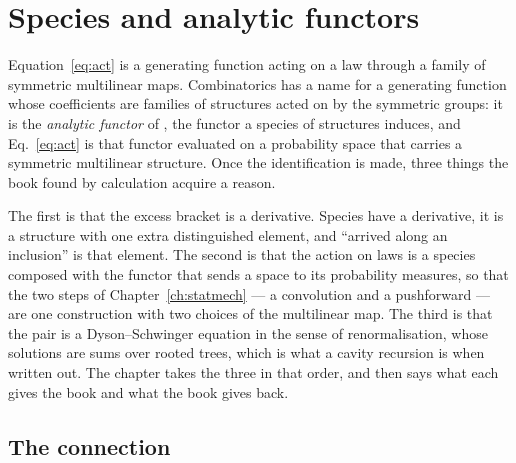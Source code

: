\chapter{Species and analytic functors}
\label{ch:species}


Equation~\eqref{eq:act} is a generating function acting on a law through a
family of symmetric multilinear maps. Combinatorics has a name for a
generating function whose coefficients are families of structures acted on
by the symmetric groups: it is the \emph{analytic functor} of \citet{joyal1986},
the functor a species of structures induces, and Eq.~\eqref{eq:act} is that
functor evaluated on a probability space that carries a symmetric multilinear
structure. Once the identification is made, three things the book found by
calculation acquire a reason.

The first is that the excess bracket is a derivative. Species have a
derivative, it is a structure with one extra distinguished element, and
``arrived along an inclusion'' is that element. The second is that the
action on laws is a species composed with the functor that sends a space to
its probability measures, so that the two steps of Chapter~\ref{ch:statmech}
--- a convolution and a pushforward --- are one construction with two
choices of the multilinear map. The third is that the pair is a
Dyson--Schwinger equation in the sense of renormalisation, whose solutions
are sums over rooted trees, which is what a cavity recursion is when written
out. The chapter takes the three in that order, and then says what each
gives the book and what the book gives back.

\section{The connection}
\label{sec:sp-connection}

